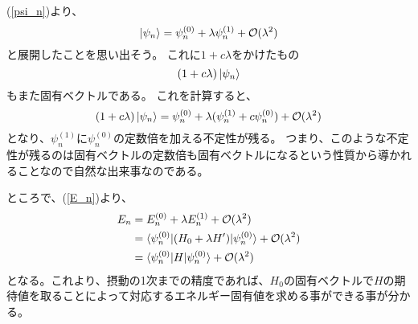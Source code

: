 (\ref{psi_n})より、
\begin{equation}
  \ket{\psi_n} = \psi_{n}^{(0)}+\lambda \psi_{n}^{(1)} + \mathcal{O}(\lambda^2)
\end{equation}
と展開したことを思い出そう。
これに$1+c\lambda$をかけたもの
\begin{equation}
  (1+c\lambda)\ket{\psi_n}
\end{equation}
もまた固有ベクトルである。
これを計算すると、
\begin{equation}
  (1+c\lambda)\ket{\psi_n} = \psi_{n}^{(0)} + \lambda(\psi_{n}^{(1)} + c\psi_{n}^{(0)}) + \mathcal{O}(\lambda^2)
\end{equation}
となり、$\psi_{n}^{(1)}$に$\psi_{n}^{(0)}$の定数倍を加える不定性が残る。
つまり、このような不定性が残るのは固有ベクトルの定数倍も固有ベクトルになるという性質から導かれることなので自然な出来事なのである。

ところで、(\ref{E_n})より、
\begin{align}
  E_{n} &= E_{n}^{(0)}+\lambda E_{n}^{(1)} + \mathcal{O}(\lambda^2) \\
  &= \braket{\psi_n^{(0)} | (H_0 + \lambda H') | \psi_n^{(0)}} + \mathcal{O}(\lambda^2) \\
  &= \braket{\psi_n^{(0)} | H | \psi_n^{(0)}} + \mathcal{O}(\lambda^2)
\end{align}
となる。これより、摂動の1次までの精度であれば、$H_0$の固有ベクトルで$H$の期待値を取ることによって対応するエネルギー固有値を求める事ができる事が分かる。
